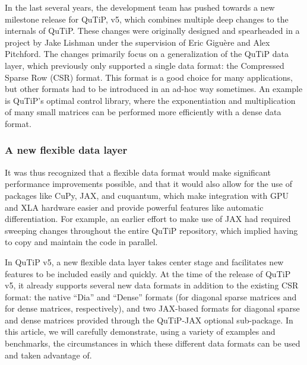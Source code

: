 \documentclass[preprint,3p,sort&compress]{elsarticle}
\begin{document}
In the last several years, the development team has pushed towards a new milestone release for QuTiP, v5, which combines multiple deep changes to the internals of QuTiP. These changes were originally designed and spearheaded in a project by Jake Lishman under the supervision of Eric Giguère and Alex Pitchford. The changes primarily focus on a generalization of the QuTiP data layer, which previously only supported a single data format: the Compressed Sparse Row (CSR) format. This format is a good choice for many applications, but other formats had to be introduced in an ad-hoc way sometimes. An example is QuTiP's optimal control library, where the exponentiation and multiplication of many small matrices can be performed more efficiently with a dense data format.
\subsubsection{A new flexible data layer}
It was thus recognized that a flexible data format would make significant performance improvements possible, and that it would also allow for the use of packages like CuPy, JAX, and cuquantum, which make integration with GPU and XLA hardware easier and provide powerful features like automatic differentiation. For example, an earlier effort \cite{qgrad} to make use of JAX had required sweeping changes throughout the entire QuTiP repository, which implied having to copy and maintain the code in parallel. %

In QuTiP v5, a new flexible data layer takes center stage and facilitates new features to be included easily and quickly. At the time of the release of QuTiP v5, it already supports several new data formats in addition to the existing CSR format: the native ``Dia'' and ``Dense'' formats (for diagonal sparse matrices and for dense matrices, respectively), and two JAX-based formats for diagonal sparse and dense matrices provided through the QuTiP-JAX optional sub-package.  In this article, we will carefully demonstrate, using a variety of examples and benchmarks, the circumstances in which these different data formats can be used and taken advantage of.
\end{document}
